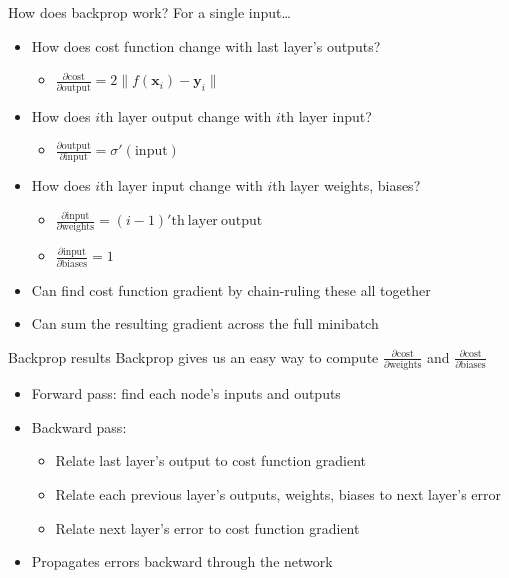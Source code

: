 \documentclass[presentation]{beamer}
\begin{document}
\begin{frame}[<+->][label={sec:orga77c89b}]{How does backprop work?}
For a single input\ldots{}
\begin{itemize}
\item How does cost function change with last layer's outputs?
\begin{itemize}
\item \(\frac{\partial\mathrm{cost}}{\partial \mathrm{output}} = 2\|f(\mathbf{x}_i) - \mathbf{y}_i\|\)
\end{itemize}
\item How does \(i\)th layer output change with \(i\)th layer input?
\begin{itemize}
\item \(\frac{\partial\mathrm{output}}{\partial\mathrm{input}} = \sigma'(\mathrm{input})\)
\end{itemize}
\item How does \(i\)th layer input change with \(i\)th layer weights, biases?
\begin{itemize}
\item \(\frac{\partial \mathrm{input}}{\partial \mathrm{weights}} = (i-1)\mathrm{'th~layer~output}\)
\item \(\frac{\partial \mathrm{input}}{\partial \mathrm{biases}} = 1\)
\end{itemize}
\item Can find cost function gradient by chain-ruling these all together
\item Can sum the resulting gradient across the full minibatch
\end{itemize}
\end{frame}


\begin{frame}[<+->][label={sec:orgf0a3a47}]{Backprop results}
Backprop gives us an easy way to compute \(\frac{\partial \mathrm{cost}}{\partial \mathrm{weights}}\) and \(\frac{\partial \mathrm{cost}}{\partial \mathrm{biases}}\)
\vfill
\begin{itemize}
\item Forward pass: find each node's inputs and outputs
\item Backward pass:
\begin{itemize}
\item Relate last layer's output to cost function gradient
\item Relate each previous layer's outputs, weights, biases to next layer's error
\item Relate next layer's error to cost function gradient
\end{itemize}
\item Propagates errors backward through the network
\end{itemize}
\end{frame}
\end{document}
